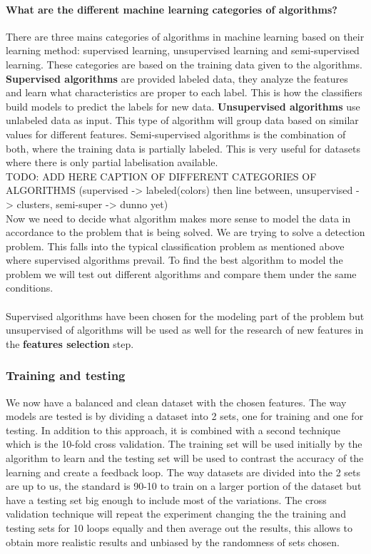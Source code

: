 \paragraph{What are the different machine learning categories of algorithms?}
There are three mains categories of algorithms in machine learning based on their learning method: supervised learning, unsupervised learning and semi-supervised learning.
These categories are based on the training data given to the algorithms. \textbf{Supervised algorithms} are provided labeled data, they analyze the features and learn what characteristics are proper to each label. This is how the classifiers build models to predict the labels for new data.
\textbf{Unsupervised algorithms} use unlabeled data as input. This type of algorithm will group data based on similar values for different features.
Semi-supervised algorithms is the combination of both, where the training data is partially labeled. This is very useful for datasets where there is only partial labelisation available.
\\
TODO: ADD HERE CAPTION OF DIFFERENT CATEGORIES OF ALGORITHMS (supervised -> labeled(colors) then line between, unsupervised -> clusters, semi-super -> dunno yet)
\\
Now we need to decide what algorithm makes more sense to model the data in accordance to the problem that is being solved. We are trying to solve a detection problem. This falls into the typical classification problem as mentioned above where supervised algorithms prevail. To find the best algorithm to model the problem we will test out different algorithms and compare them under the same conditions.
\\
\\
Supervised algorithms have been chosen for the modeling part of the problem but unsupervised of algorithms will be used as well for the research of new features in the \textbf{features selection} step.

\subsubsection{Training and testing}
We now have a balanced and clean dataset with the chosen features. The way models are tested is by dividing a dataset into 2 sets, one for training and one for testing. In addition to this approach, it is combined with a second technique which is the 10-fold cross validation\cite{10-fold}. The training set will be used initially by the algorithm to learn and the testing set will be used to contrast the accuracy of the learning and create a feedback loop. The way datasets are divided into the 2 sets are up to us, the standard is 90-10 to train on a larger portion of the dataset but have a testing set big enough to include most of the variations. The cross validation technique will repeat the experiment changing the the training and testing sets for 10 loops equally and then average out the results, this allows to obtain more realistic results and unbiased by the randomness of sets chosen.

